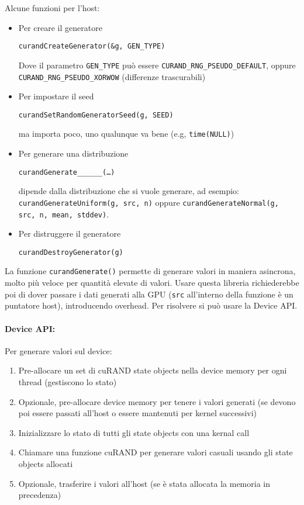 Alcune funzioni per l'host: 
\begin{itemize}
	\item Per creare il generatore
	\begin{verbatim}
curandCreateGenerator(&g, GEN_TYPE)
	\end{verbatim}
	Dove il parametro \texttt{GEN\_TYPE} può essere \texttt{CURAND\_RNG\_PSEUDO\_DEFAULT}, oppure \texttt{CURAND\_RNG\_PSEUDO\_XORWOW} (differenze trascurabili)
	
	\item Per impostare il seed
	\begin{verbatim}
curandSetRandomGeneratorSeed(g, SEED)
	\end{verbatim}
	ma importa poco, uno qualunque va bene (e.g, \texttt{time(NULL)})
	
	\item Per generare una distribuzione
	\begin{verbatim}
curandGenerate______(…)
	\end{verbatim}
	dipende dalla distribuzione che si vuole generare, ad esempio: \texttt{curandGenerateUniform(g, src, n)} oppure \texttt{curandGenerateNormal(g, src, n, mean, stddev)}. 
	\item Per distruggere il generatore
	\begin{verbatim}
curandDestroyGenerator(g)
	\end{verbatim}
\end{itemize}

La funzione \texttt{curandGenerate()} permette di generare valori in maniera asincrona, molto più veloce per quantità elevate di valori. Usare questa libreria richiederebbe poi di dover passare i dati generati alla GPU (\texttt{src} all'interno della funzione è un puntatore host), introducendo overhead. Per risolvere si può usare la Device API.\\

\paragraph{Device API:} Per generare valori sul device: 
\begin{enumerate}
	\item Pre-allocare un set di cuRAND state objects nella device memory per ogni thread (gestiscono lo stato)
	\item Opzionale, pre-allocare device memory per tenere i valori generati (se devono poi essere passati all'host o essere mantenuti per kernel successivi)
	\item Inizializzare lo stato di tutti gli state objects con una kernal call
	\item Chiamare una funzione cuRAND per generare valori casuali usando gli state objects allocati
	\item Opzionale, trasferire i valori all'host (se è stata allocata la memoria in precedenza)
\end{enumerate}

